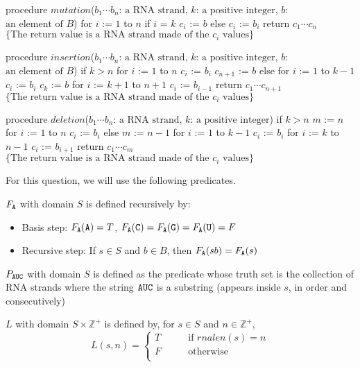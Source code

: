 \documentclass[12pt, oneside]{article}
\begin{document}
\begin{enumerate}
\begin{algorithm}
procedure $\textit{mutation}$($b_1\cdots b_n$: $\textrm{a RNA strand}$, $k$: $\textrm{a  positive integer}$, $b$: $\textrm{an  element of } B$)
for $i$ := $1$ to $n$
  if $i$ = $k$
    $c_i$ := $b$
  else
    $c_i$ := $b_i$
return $c_1\cdots c_n$ $\{ \textrm{The return value is a RNA strand made of the } c_i \textrm{ values}\}$
\end{algorithm}

\begin{algorithm}
procedure $\textit{insertion}$($b_1\cdots b_n$: $\textrm{a RNA strand}$, $k$: $\textrm{a  positive integer}$, $b$: $\textrm{an  element of } B$)
if $k > n$
  for $i$ := $1$ to $n$
    $c_i$ := $b_i$
  $c_{n+1}$ := $b$
else 
  for $i$ := $1$ to $k-1$
    $c_i$ := $b_i$
  $c_k$ := $b$
  for $i$ := $k+1$ to $n+1$
    $c_i$ := $b_{i-1}$
return $c_1\cdots c_{n+1}$ $\{ \textrm{The return value is a RNA strand made of the } c_i \textrm{ values}\}$
\end{algorithm}

\begin{algorithm}
procedure $\textit{deletion}$($b_1\cdots b_n$: $\textrm{a RNA strand}$, $k$: $\textrm{a  positive integer}$)
if $k > n$
  $m$ := $n$
  for $i$ := $1$ to $n$
    $c_i$ := $b_i$
else
  $m$ := $n-1$
  for $i$ := $1$ to $k-1$ 
    $c_i$ := $b_i$
  for $i$ := $k$ to $n-1$
    $c_i$ := $b_{i+1}$
return $c_1\cdots c_m$ $\{ \textrm{The return value is a RNA strand made of the } c_i \textrm{ values}\}$
\end{algorithm}

For this question, we will use the following predicates.

$F_{\texttt{A}}$ with domain $S$ is defined recursively by: 
\begin{itemize}
\item[]Basis step: $F_{\texttt{A}}(\texttt{A}) = T$, $F_{\texttt{A}}(\texttt{C}) = F_{\texttt{A}}(\texttt{G}) = F_{\texttt{A}}(\texttt{U}) = F$
\item[]Recursive step: If $s \in S$ and $b \in B$, then $F_{\texttt{A}}(sb) = F_{\texttt{A}}(s)$
\end{itemize}

$P_{\texttt{A}\texttt{U}\texttt{C}}$ with domain $S$ is defined as the predicate whose truth set
is the collection of RNA strands where the string $\texttt{A}\texttt{U}\texttt{C}$
is a substring (appears inside $s$, in order and consecutively)

$L$ with domain $S \times \mathbb{Z}^+$ is defined by, for $s \in S$ and $n \in \mathbb{Z}^+$,
\[
L( s, n) = \begin{cases}
T &\qquad\text{if $rnalen(s) = n$}\\
F &\qquad\text{otherwise}\\
\end{cases}
\]


\end{enumerate}
\end{document}

